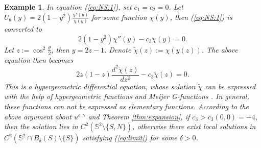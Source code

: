 \documentclass[12pt]{article}
\newtheorem{example}{Example}[section]
\begin{document}
\begin{example}\label{example:least:sing}
	In equation (\ref{eq:NS:1}), set $c_1=c_2=0$. Let $U_\theta (y)= 2(1-y^2)\frac{\chi'(y)}{\chi(y)}$ for some function $\chi(y)$, then (\ref{eq:NS:1}) is converted to 
	\[
		2(1-y^2) \chi''(y) - c_3 \chi(y) = 0. 
	\]
	Let $z := \cos^2\frac{\theta}{2}$, then $y = 2z-1$. Denote $\tilde{\chi}(z) := \chi(y(z)) $. The above equation then becomes
	\[
		2 z (1-z) \frac{d^2 \tilde{\chi}(z)}{dz^2} - c_3 \tilde{\chi}(z) = 0. 
	\]
	This is a hypergeometric differential equation, whose solution $\tilde{\chi}$ can be expressed with the help of hypergeometric functions and Meijer G-functions \cite{OLBC,EMOT}. In general, these functions can not be expressed as elementary functions. According to the above argument about $u^{c, \gamma}$ and Theorem \ref{thm:expansion}, if $c_3>\bar{c}_3(0,0) = -4$, then the solution lies in $C^2(\mathbb{S}^2\setminus\{S, N\})$, otherwise there exist local solutions in $C^2(\mathbb{S}^2\cap B_\delta(S)\setminus\{S\})$ satisfying (\ref{eq:limit}) for some $\delta > 0$. 


\end{example}
\end{document}
